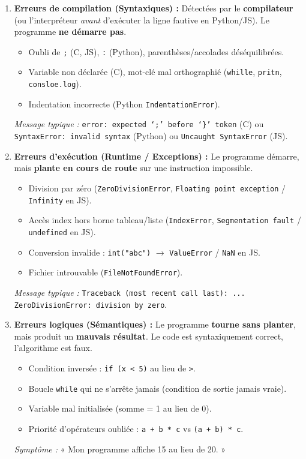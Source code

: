 \documentclass[11pt]{article}
\begin{document}
\begin{propriete}
\begin{enumerate}
    \item \textbf{Erreurs de compilation (Syntaxiques) :} Détectées par le \textbf{compilateur} (ou l'interpréteur \emph{avant} d'exécuter la ligne fautive en Python/JS). Le programme \textbf{ne démarre pas}.
        \begin{itemize}
            \item Oubli de \texttt{;} (C, JS), \texttt{:} (Python), parenthèses/accolades déséquilibrées.
            \item Variable non déclarée (C), mot-clé mal orthographié (\texttt{whille}, \texttt{pritn}, \texttt{consloe.log}).
            \item Indentation incorrecte (Python \texttt{IndentationError}).
        \end{itemize}
        \emph{Message typique :} \texttt{error: expected `;' before `\}' token} (C) ou \texttt{SyntaxError: invalid syntax} (Python) ou \texttt{Uncaught SyntaxError} (JS).
    \item \textbf{Erreurs d'exécution (Runtime / Exceptions) :} Le programme démarre, mais \textbf{plante en cours de route} sur une instruction impossible.
        \begin{itemize}
            \item Division par zéro (\texttt{ZeroDivisionError}, \texttt{Floating point exception} / \texttt{Infinity} en JS).
            \item Accès index hors borne tableau/liste (\texttt{IndexError}, \texttt{Segmentation fault} / \texttt{undefined} en JS).
            \item Conversion invalide : \texttt{int("abc")} $\to$ \texttt{ValueError} / \texttt{NaN} en JS.
            \item Fichier introuvable (\texttt{FileNotFoundError}).
        \end{itemize}
        \emph{Message typique :} \texttt{Traceback (most recent call last): ... ZeroDivisionError: division by zero}.
    \item \textbf{Erreurs logiques (Sémantiques) :} Le programme \textbf{tourne sans planter}, mais produit un \textbf{mauvais résultat}. Le code est syntaxiquement correct, l'algorithme est faux.
        \begin{itemize}
            \item Condition inversée : \texttt{if (x < 5)} au lieu de \texttt{>}.
            \item Boucle \texttt{while} qui ne s'arrête jamais (condition de sortie jamais vraie).
            \item Variable mal initialisée (somme = 1 au lieu de 0).
            \item Priorité d'opérateurs oubliée : \texttt{a + b * c} vs \texttt{(a + b) * c}.
        \end{itemize}
        \emph{Symptôme :} « Mon programme affiche 15 au lieu de 20. »
\end{enumerate}
\end{propriete}
\end{document}

